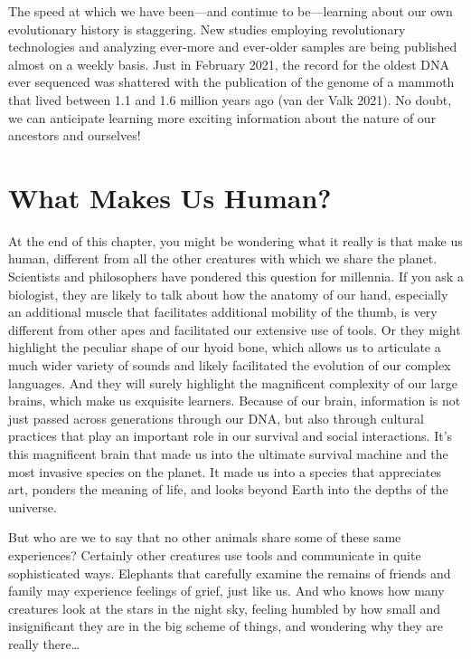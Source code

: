 \documentclass[
]{book}
\begin{document}
The speed at which we have been---and continue to be---learning about our own evolutionary history is staggering. New studies employing revolutionary technologies and analyzing ever-more and ever-older samples are being published almost on a weekly basis. Just in February 2021, the record for the oldest DNA ever sequenced was shattered with the publication of the genome of a mammoth that lived between 1.1 and 1.6 million years ago (van der Valk 2021). No doubt, we can anticipate learning more exciting information about the nature of our ancestors and ourselves!

\hypertarget{what-makes-us-human}{%
\section{What Makes Us Human?}\label{what-makes-us-human}}

At the end of this chapter, you might be wondering what it really is that make us human, different from all the other creatures with which we share the planet. Scientists and philosophers have pondered this question for millennia. If you ask a biologist, they are likely to talk about how the anatomy of our hand, especially an additional muscle that facilitates additional mobility of the thumb, is very different from other apes and facilitated our extensive use of tools. Or they might highlight the peculiar shape of our hyoid bone, which allows us to articulate a much wider variety of sounds and likely facilitated the evolution of our complex languages. And they will surely highlight the magnificent complexity of our large brains, which make us exquisite learners. Because of our brain, information is not just passed across generations through our DNA, but also through cultural practices that play an important role in our survival and social interactions. It's this magnificent brain that made us into the ultimate survival machine and the most invasive species on the planet. It made us into a species that appreciates art, ponders the meaning of life, and looks beyond Earth into the depths of the universe.

But who are we to say that no other animals share some of these same experiences? Certainly other creatures use tools and communicate in quite sophisticated ways. Elephants that carefully examine the remains of friends and family may experience feelings of grief, just like us. And who knows how many creatures look at the stars in the night sky, feeling humbled by how small and insignificant they are in the big scheme of things, and wondering why they are really there\ldots{}
\end{document}
